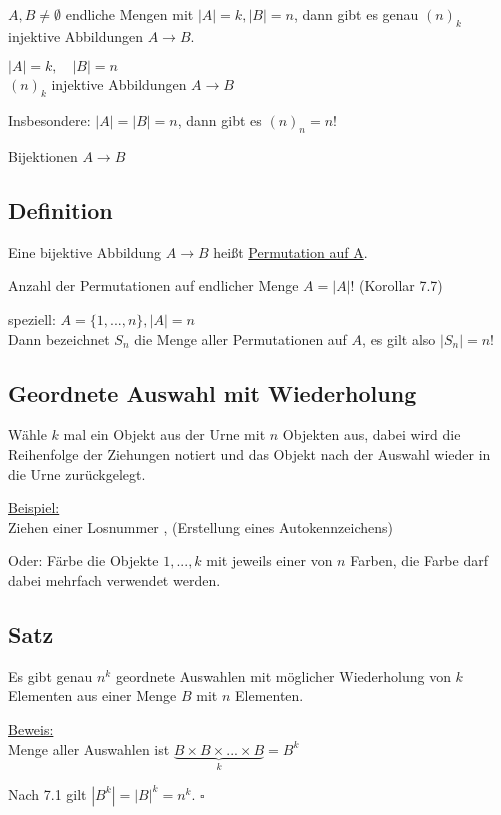 \documentclass[a4paper, 12pt, twoside] {article}
\begin{document}
$A, B \neq \emptyset$ endliche Mengen mit $|A| = k, |B| = n$, dann gibt es genau $(n)_k$ injektive Abbildungen $A \rightarrow B$.

$|A| = k, \quad |B| = n$ \\
$(n)_k$ injektive Abbildungen $A \rightarrow B$

Insbesondere: $|A| = |B| = n$, dann gibt es $(n)_n = n!$

Bijektionen $A \rightarrow B$

\subsection{Definition} %

Eine bijektive Abbildung $A \rightarrow B$ heißt \uline{Permutation auf A}.

Anzahl der Permutationen auf endlicher Menge $A = |A| !$ (Korollar 7.7)

speziell: $A = \{1, ..., n\}, |A| = n$ \\
Dann bezeichnet $S_n$ die Menge aller Permutationen auf $A$, es gilt also $|S_n| = n!$

\subsection{Geordnete Auswahl mit Wiederholung} %


Wähle $k$ mal ein Objekt aus der Urne mit $n$ Objekten aus, dabei wird die Reihenfolge der Ziehungen notiert und das Objekt nach der Auswahl wieder in die Urne zurückgelegt.

\uline{Beispiel:} \\
Ziehen einer Losnummer , (Erstellung eines Autokennzeichens)

Oder: Färbe die Objekte $1, ... ,k$ mit jeweils einer von $n$ Farben, die Farbe darf dabei mehrfach verwendet werden.

\subsection{Satz} %
Es gibt genau $n^k$ geordnete Auswahlen mit möglicher Wiederholung von $k$ Elementen aus einer Menge $B$ mit $n$ Elementen.

\uline{Beweis:} \\
Menge aller Auswahlen ist $\underbrace{B \times B \times ... \times B}_{k} = B^k$

Nach 7.1 gilt $|B^k| = |B|^k = n^k$. \hfill $\square$
\end{document}
